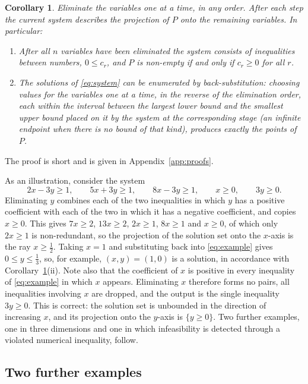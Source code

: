 \documentclass[11pt]{article}
\newtheorem{corollary}{Corollary}
\theoremstyle{definition}
\begin{document}
\begin{corollary}
\label{cor:global}
Eliminate the variables one at a time, in any order. After each step the current system describes the projection of $P$ onto the remaining variables. In particular:
\begin{enumerate}
\item[(i)] After all $n$ variables have been eliminated the system consists of inequalities between numbers, $0\le c_r$, and $P$ is non-empty if and only if $c_r\ge 0$ for all $r$.
\item[(ii)] The solutions of \eqref{eq:system} can be enumerated by back-substitution: choosing values for the variables one at a time, in the reverse of the elimination order, each within the interval between the largest lower bound and the smallest upper bound placed on it by the system at the corresponding stage (an infinite endpoint when there is no bound of that kind), produces exactly the points of $P$.
\end{enumerate}
\end{corollary}

The proof is short and is given in Appendix~\ref{app:proofs}.

As an illustration, consider the system
\begin{equation}
2x-3y\ge 1,\qquad 5x+3y\ge 1,\qquad 8x-3y\ge 1,\qquad x\ge 0,\qquad 3y\ge 0.
\label{eq:example}
\end{equation}
Eliminating $y$ combines each of the two inequalities in which $y$ has a positive coefficient with each of the two in which it has a negative coefficient, and copies $x\ge 0$. This gives $7x\ge 2$, $13x\ge 2$, $2x\ge 1$, $8x\ge 1$ and $x\ge 0$, of which only $2x\ge 1$ is non-redundant, so the projection of the solution set onto the $x$-axis is the ray $x\ge\frac12$. Taking $x=1$ and substituting back into \eqref{eq:example} gives $0\le y\le\frac13$, so, for example, $(x,y)=(1,0)$ is a solution, in accordance with Corollary~\ref{cor:global}(ii). Note also that the coefficient of $x$ is positive in every inequality of \eqref{eq:example} in which $x$ appears. Eliminating $x$ therefore forms no pairs, all inequalities involving $x$ are dropped, and the output is the single inequality $3y\ge 0$. This is correct: the solution set is unbounded in the direction of increasing $x$, and its projection onto the $y$-axis is $\{y\ge 0\}$. Two further examples, one in three dimensions and one in which infeasibility is detected through a violated numerical inequality, follow.

\subsection{Two further examples}
\label{sec:examples}
\end{document}

